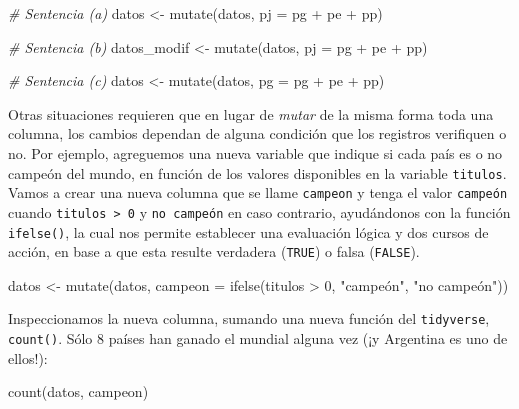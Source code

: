\documentclass[
]{book}
\newenvironment{Shaded}{\begin{snugshade}}{\end{snugshade}}
\newcommand{\AttributeTok}[1]{\textcolor[rgb]{0.77,0.63,0.00}{#1}}
\newcommand{\CommentTok}[1]{\textcolor[rgb]{0.56,0.35,0.01}{\textit{#1}}}
\newcommand{\DecValTok}[1]{\textcolor[rgb]{0.00,0.00,0.81}{#1}}
\newcommand{\FunctionTok}[1]{\textcolor[rgb]{0.00,0.00,0.00}{#1}}
\newcommand{\NormalTok}[1]{#1}
\newcommand{\OtherTok}[1]{\textcolor[rgb]{0.56,0.35,0.01}{#1}}
\newcommand{\SpecialCharTok}[1]{\textcolor[rgb]{0.00,0.00,0.00}{#1}}
\newcommand{\StringTok}[1]{\textcolor[rgb]{0.31,0.60,0.02}{#1}}
\begin{document}
\begin{Shaded}
\begin{Highlighting}[]
\CommentTok{\# Sentencia (a)}
\NormalTok{datos }\OtherTok{\textless{}{-}} \FunctionTok{mutate}\NormalTok{(datos, }\AttributeTok{pj =}\NormalTok{ pg }\SpecialCharTok{+}\NormalTok{ pe }\SpecialCharTok{+}\NormalTok{ pp)}

\CommentTok{\# Sentencia (b)}
\NormalTok{datos\_modif }\OtherTok{\textless{}{-}} \FunctionTok{mutate}\NormalTok{(datos, }\AttributeTok{pj =}\NormalTok{ pg }\SpecialCharTok{+}\NormalTok{ pe }\SpecialCharTok{+}\NormalTok{ pp)}

\CommentTok{\# Sentencia (c)}
\NormalTok{datos }\OtherTok{\textless{}{-}} \FunctionTok{mutate}\NormalTok{(datos, }\AttributeTok{pg =}\NormalTok{ pg }\SpecialCharTok{+}\NormalTok{ pe }\SpecialCharTok{+}\NormalTok{ pp)}
\end{Highlighting}
\end{Shaded}

Otras situaciones requieren que en lugar de \emph{mutar} de la misma forma toda una columna, los cambios dependan de alguna condición que los registros verifiquen o no. Por ejemplo, agreguemos una nueva variable que indique si cada país es o no campeón del mundo, en función de los valores disponibles en la variable \texttt{titulos}. Vamos a crear una nueva columna que se llame \texttt{campeon} y tenga el valor \texttt{campeón} cuando \texttt{titulos\ \textgreater{}\ 0} y \texttt{no\ campeón} en caso contrario, ayudándonos con la función \texttt{ifelse()}, la cual nos permite establecer una evaluación lógica y dos cursos de acción, en base a que esta resulte verdadera (\texttt{TRUE}) o falsa (\texttt{FALSE}).

\begin{Shaded}
\begin{Highlighting}[]
\NormalTok{datos }\OtherTok{\textless{}{-}} \FunctionTok{mutate}\NormalTok{(datos, }\AttributeTok{campeon =} \FunctionTok{ifelse}\NormalTok{(titulos }\SpecialCharTok{\textgreater{}} \DecValTok{0}\NormalTok{, }\StringTok{"campeón"}\NormalTok{, }\StringTok{"no campeón"}\NormalTok{))}
\end{Highlighting}
\end{Shaded}

Inspeccionamos la nueva columna, sumando una nueva función del \texttt{tidyverse}, \texttt{count()}. Sólo 8 países han ganado el mundial alguna vez (¡y Argentina es uno de ellos!):

\begin{Shaded}
\begin{Highlighting}[]
\FunctionTok{count}\NormalTok{(datos, campeon)}
\end{Highlighting}
\end{Shaded}
\end{document}
